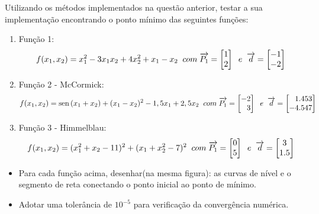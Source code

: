 \documentclass[10pt, a4paper]{article}
\DeclareMathOperator{\sen}{sen}
\begin{document}
Utilizando os métodos implementados na questão anterior, testar a sua implementação encontrando o ponto mínimo
das seguintes funções:

\begin{enumerate}
  \item Função 1: 
  \begin{equation*}
    f(x_1, x_2) = x_1^2 - 3x_1x_2 + 4x_2^2 + x_1 - x_2 \;\; com \;\; \\
    \overrightarrow{P_1} = 
    \begin{bmatrix}
     1 \\ 2
    \end{bmatrix} \;\; e \;\; \overrightarrow{d} =
    \begin{bmatrix}
    -1 \\ -2
    \end{bmatrix}
 \end{equation*}

 \item Função 2 - McCormick:
 \begin{equation*}
  f(x_1, x_2) = \sen{(x_1 + x_2)} + (x_1 - x_2)^2 - 1,5x_1 + 2,5x_2 \;\; com \;\; \\
  \overrightarrow{P_1} = 
  \begin{bmatrix}
   -2 \\ \phantom{-}3
  \end{bmatrix} \;\; e \;\; \overrightarrow{d} =
  \begin{bmatrix}
  \phantom{-}1.453 \\ -4.547
  \end{bmatrix}
\end{equation*}

\item Função 3 - Himmelblau:
 \begin{equation*}
  f(x_1, x_2) = (x_1^2 + x_2 - 11)^2 + (x_1 + x_2^2 - 7)^2 \;\; com \;\; \\
  \overrightarrow{P_1} = 
  \begin{bmatrix}
   0 \\ 5
  \end{bmatrix} \;\; e \;\; \overrightarrow{d} =
  \begin{bmatrix}
  3 \\ 1.5
  \end{bmatrix}
\end{equation*}

\end{enumerate}

\begin{itemize}
  \item Para cada função acima, desenhar(na mesma figura): as curvas de nível e o segmento de reta
  conectando o ponto inicial ao ponto de mínimo.
  \item Adotar uma tolerância de $10^{-5}$ para verificação da convergência numérica.
\end{itemize}
\end{document}
